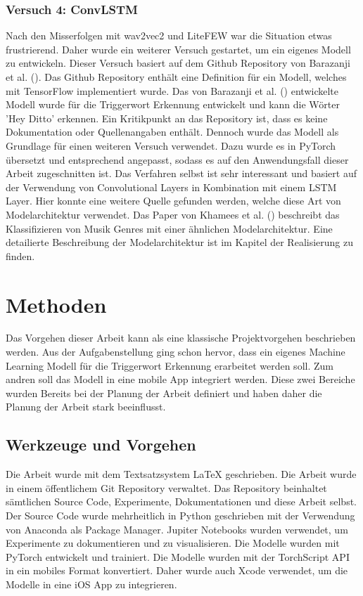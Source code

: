 \documentclass[11pt,a4paper]{article}
\begin{document}
\subsubsection{Versuch 4: ConvLSTM}
Nach den Misserfolgen mit wav2vec2 und LiteFEW war die Situation etwas frustrierend. Daher wurde 
ein weiterer Versuch gestartet, um ein eigenes Modell zu entwickeln. Dieser Versuch basiert auf 
dem Github Repository von Barazanji et al. (\cite{barazanji2023heyditto}). Das Github Repository 
enthält eine Definition für ein Modell, welches mit TensorFlow implementiert wurde. Das von 
Barazanji et al. (\cite{barazanji2023heyditto}) entwickelte Modell wurde für die Triggerwort 
Erkennung entwickelt und kann die Wörter 'Hey Ditto' erkennen. Ein Kritikpunkt an das Repository 
ist, dass es keine Dokumentation oder Quellenangaben enthält. Dennoch wurde das Modell als 
Grundlage für einen weiteren Versuch verwendet. Dazu wurde es in PyTorch übersetzt und 
entsprechend angepasst, sodass es auf den Anwendungsfall dieser Arbeit zugeschnitten ist. 
Das Verfahren selbst ist sehr interessant und basiert auf der Verwendung von Convolutional Layers 
in Kombination mit einem LSTM Layer. Hier konnte eine weitere Quelle gefunden werden, welche 
diese Art von Modelarchitektur verwendet. Das Paper von Khamees et al. 
(\cite{khamees2021classifying}) beschreibt das Klassifizieren von Musik Genres mit einer 
ähnlichen Modelarchitektur. Eine detailierte Beschreibung der Modelarchitektur ist im Kapitel der 
Realisierung zu finden.

\newpage \section{Methoden}
Das Vorgehen dieser Arbeit kann als eine klassische Projektvorgehen beschrieben werden. Aus der 
Aufgabenstellung ging schon hervor, dass ein eigenes Machine Learning Modell für die Triggerwort 
Erkennung erarbeitet werden soll. Zum andren soll das Modell in eine mobile App integriert werden.
Diese zwei Bereiche wurden Bereits bei der Planung der Arbeit definiert und haben daher die 
Planung der Arbeit stark beeinflusst.

\subsection{Werkzeuge und Vorgehen}
Die Arbeit wurde mit dem Textsatzsystem LaTeX geschrieben. Die Arbeit wurde in einem öffentlichem 
Git Repository verwaltet. Das Repository beinhaltet sämtlichen Source Code, Experimente, 
Dokumentationen und diese Arbeit selbst. Der Source Code wurde mehrheitlich in Python geschrieben 
mit der Verwendung von Anaconda als Package Manager. Jupiter Notebooks wurden verwendet, um 
Experimente zu dokumentieren und zu visualisieren. Die Modelle wurden mit PyTorch entwickelt und 
trainiert. Die Modelle wurden mit der TorchScript API in ein mobiles Format konvertiert. Daher 
wurde auch Xcode verwendet, um die Modelle in eine iOS App zu integrieren.
\end{document}
